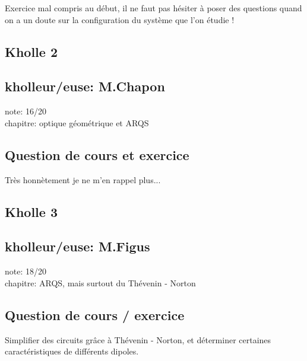 \documentclass{article}
\begin{document}
Exercice mal compris au début, il ne faut pas hésiter à poser des questions quand on a un doute sur la configuration du système que l'on étudie !

\subsection{Kholle 2}
\subsection{kholleur/euse: M.Chapon}

note: 16/20 \\
chapitre: optique géométrique et ARQS

\subsection{Question de cours et exercice}

Très honnètement je ne m'en rappel plus...

\subsection{Kholle 3}
\subsection{kholleur/euse: M.Figus}

note: 18/20 \\
chapitre: ARQS, mais surtout du Thévenin - Norton

\subsection{Question de cours / exercice}

Simplifier des circuits grâce à Thévenin - Norton, et déterminer certaines caractéristiques de différents dipoles. \\
\end{document}
